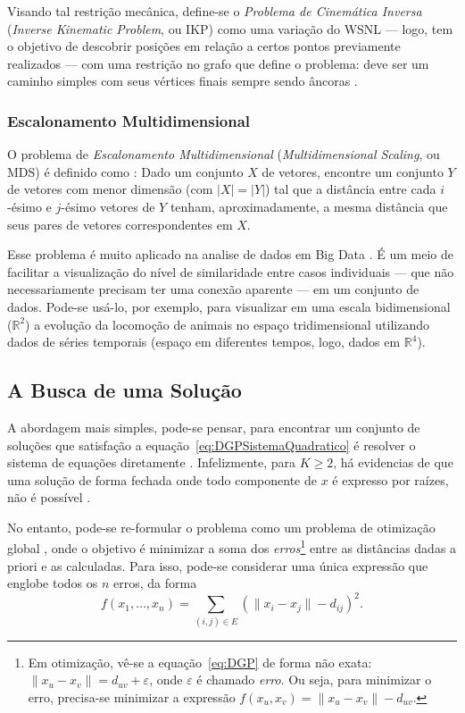 Visando tal restrição mecânica, define-se o \textit{Problema de Cinemática Inversa} (\textit{Inverse Kinematic Problem}, ou IKP) como uma variação do WSNL --- logo, tem o objetivo de descobrir posições em relação a certos pontos previamente realizados --- com uma restrição no grafo que define o problema: deve ser um caminho simples com seus vértices finais sempre sendo âncoras \cite{carlileGDandAplications}.

\subsubsection{Escalonamento Multidimensional}

O problema de \textit{Escalonamento Multidimensional} (\textit{Multidimensional Scaling}, ou MDS)
é definido como \cite{carlileGDandAplications}: Dado um conjunto $X$ de vetores, encontre um conjunto $Y$ de vetores com menor dimensão (com $|X| = |Y|$) tal que a distância entre cada $i$-ésimo e $j$-ésimo vetores de $Y$ tenham, aproximadamente, a mesma distância que seus pares de vetores correspondentes em $X$.

Esse problema é muito aplicado na analise de dados em Big Data \cite{libertiEDG}. É um meio de facilitar a visualização do nível de similaridade entre casos individuais --- que não necessariamente precisam ter uma conexão aparente --- em um conjunto de dados. Pode-se usá-lo, por exemplo, para visualizar em uma escala bidimensional ($\mathbb{R}^2$) a evolução da locomoção de animais no espaço tridimensional utilizando dados de séries temporais (espaço em diferentes tempos, logo, dados em $\mathbb{R}^4$).

\subsection{A Busca de uma Solução}

A abordagem mais simples, pode-se pensar, para encontrar um conjunto de soluções que satisfação a equação~\ref{eq:DGPSistemaQuadratico} é resolver o sistema de equações diretamente \cite{carlileBook31Coloquio}. Infelizmente, para $K \geq 2$, há evidencias de que uma solução de forma fechada onde todo componente de $x$ é expresso por raízes, não é possível \cite{libertiEDG}. 

No entanto, pode-se re-formular o problema como um problema de otimização global \cite{libertiEDG}, onde o objetivo é minimizar a soma dos \textit{erros}\footnote{Em otimização, vê-se a equação~\ref{eq:DGP} de forma não exata: $\lVert x_u - x_v \rVert = d_{uv} + \varepsilon$, onde $\varepsilon$ é chamado \textit{erro}. Ou seja, para minimizar o erro, precisa-se minimizar a expressão $f(x_u,x_v) = \lVert x_u - x_v \rVert - d_{uv}$.} entre as distâncias dadas a priori e as calculadas. Para isso, pode-se considerar uma única expressão que englobe todos os $n$ erros, da forma
\begin{equation}
	f(x_1,\dots,x_n) = \sum_{(i,j)\in E} \left(\lVert x_i - x_j \rVert - d_{ij}\right)^2.
\end{equation}

